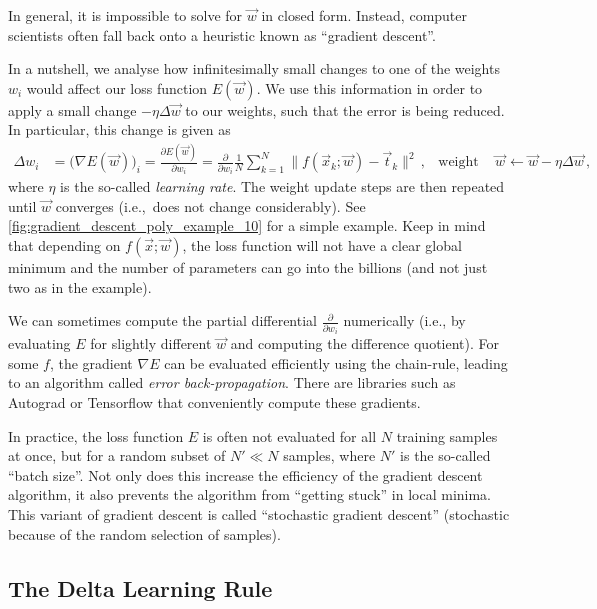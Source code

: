 \documentclass[10pt,letterpaper,oneside]{article}
\begin{document}
In general, it is impossible to solve for $\vec w$ in closed form. Instead, computer scientists often fall back onto a heuristic known as \enquote{gradient descent}.

In a nutshell, we analyse how infinitesimally small changes to one of the weights $w_i$ would affect our loss function $E(\vec w)$. We use this information in order to apply a small change $- \eta \Delta \vec w$ to our weights, such that the error is being reduced. In particular, this change is given as
\begin{align*}
	\Delta w_i &= \big( \nabla E(\vec w) \big)_i =  \frac{\partial E(\vec w)}{\partial w_i} = \frac{\partial}{\partial w_i} \frac{1}{N} \sum_{k = 1}^N \big\| f(\vec x_k ; \vec w) - \vec t_k \big\|^2 \,, & \text{weight update step } \vec w &\gets \vec w - \eta \Delta \vec w \,,
\end{align*}
where $\eta$ is the so-called \emph{learning rate}. The weight update steps are then repeated until $\vec w$ converges (i.e.,~does not change considerably). See \cref{fig:gradient_descent_poly_example_10} for a simple example. Keep in mind that depending on $f(\vec x; \vec w)$, the loss function will not have a clear global minimum and the number of parameters can go into the billions (and not just two as in the example).

We can sometimes compute the partial differential $\frac{\partial}{\partial w_i}$ numerically (i.e., by evaluating $E$ for slightly different $\vec w$ and computing the difference quotient). For some $f$, the gradient $\nabla E$ can be evaluated efficiently using the chain-rule, leading to an algorithm called \emph{error back-propagation}. There are libraries such as Autograd or Tensorflow that conveniently compute these gradients.

In practice, the loss function $E$ is often not evaluated for all $N$ training samples at once, but for a random subset of $N' \ll N$ samples, where $N'$ is the so-called \enquote{batch size}. Not only does this increase the efficiency of the gradient descent algorithm, it also prevents the algorithm from \enquote{getting stuck} in local minima. This variant of gradient descent is called \enquote{stochastic gradient descent} (stochastic because of the random selection of samples).

\subsection{The Delta Learning Rule}
\end{document}
